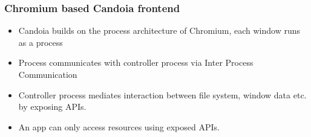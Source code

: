         \begin{frame}
            \frametitle{Chromium based Candoia frontend}
            \begin{itemize}
                \item Candoia builds on the process architecture of Chromium, each window runs as a process
                \item Process communicates with controller process via Inter Process Communication
                \item Controller process mediates interaction between file system, window data etc. by exposing APIs.
                \item An app can only access resources using exposed APIs.
            \end{itemize}
         \end{frame}
